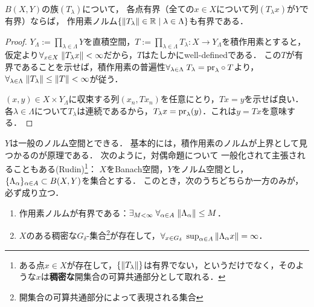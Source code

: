 \documentclass[uplatex,dvipdfmx]{jsreport}
\begin{document}
\begin{theorem}
    $B(X,Y)$の族$(T_\lambda)$について，
    各点有界（全ての$x\in X$について列$(T_\lambda x)$が$Y$で有界）ならば，
    作用素ノルム$\{\|T_\lambda\|\in\mathbb{R}\mid\lambda\in\Lambda\}$も有界である．
\end{theorem}
\begin{proof}
    $Y_\Lambda:=\prod_{\lambda\in\Lambda}Y$を直積空間，$T:=\prod_{\lambda\in\Lambda}T_\lambda:X\to Y_\Lambda$を積作用素とすると，
    仮定より$\forall_{x\in X}\;\|T_\lambda x\|<\infty$だから，$T$はたしかにwell-definedである．
    この$T$が有界であることを示せば，積作用素の普遍性$\forall_{\lambda\in\Lambda}\;T_\lambda=\mathrm{pr}_\lambda\circ T$より，$\forall_{\lambda\in\Lambda}\;\|T_\lambda\|\le\|T\|<\infty$が従う．

    $(x,y)\in X\times Y_\Lambda$に収束する列$(x_n,Tx_n)$を任意にとり，$Tx=y$を示せば良い．
    各$\lambda\in\Lambda$について$T_\lambda$は連続であるから，$T_\lambda x=\mathrm{pr}_\lambda(y)$．これは$y=Tx$を意味する．
\end{proof}
\begin{remark}
    $Y$は一般のノルム空間とできる．
    基本的には，積作用素のノルムが上界として見つかるのが原理である．
    次のように，対偶命題について
    一般化されて主張されることもある(Rudin)\footnote{ある点$x\in X$が存在して，$\{\|T_\lambda\|\}$は有界でない，というだけでなく，そのような$x$は\textbf{稠密な}開集合の可算共通部分として取れる．}：
    $X$をBanach空間，$Y$をノルム空間とし，$\{\Lambda_\alpha\}_{\alpha\in A}\subset B(X,Y)$を集合とする．
    このとき，次のうちどちらか一方のみが，必ず成り立つ．
    \begin{enumerate}
        \item 作用素ノルムが有界である：$\exists_{M<\infty}\;\forall_{\alpha\in A}\;\|\Lambda_\alpha\|\le M$．
        \item $X$のある稠密な$G_\delta$-集合\footnote{開集合の可算共通部分によって表現される集合}が存在して，$\forall_{x\in G_\delta}\;\sup_{\alpha\in A}\|\Lambda_\alpha x\|=\infty$．
    \end{enumerate}
\end{remark}
\end{document}
